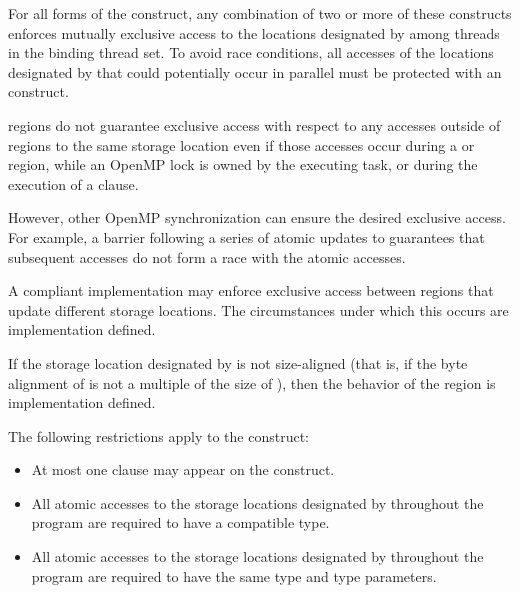 {{{{For all forms of the  construct, any combination of two or more
of these  constructs enforces mutually exclusive access to the
locations designated by  among threads in the binding thread set.  To
avoid race conditions, all accesses of the locations designated by 
that could potentially occur in parallel must be protected with an
 construct. 

 regions do not guarantee exclusive access with respect to any accesses outside 
of  regions to the same storage location  even if those accesses occur during a 
 or  region, while an OpenMP lock is owned by the executing 
task, or during the execution of a  clause.

However, other OpenMP synchronization can ensure the desired exclusive access. For 
example, a barrier following a series of atomic updates to  guarantees that subsequent 
accesses do not form a race with the atomic accesses. 

A compliant implementation may enforce exclusive access between  regions 
that update different storage locations. The circumstances under which this occurs are 
implementation defined. 

If the storage location designated by  is not size-aligned (that is, if the byte alignment 
of  is not a multiple of the size of ), then the behavior of the  region is 
implementation defined.

\begin{samepage}
\restrictions

The following restrictions apply to the  construct:

\begin{itemize}
\item At most one  clause may appear on the construct.
\end{itemize}

\ccppspecificstart
\begin{itemize}
\item All atomic accesses to the storage locations designated by  throughout the program 
are required to have a compatible type. 
\end{itemize}
\ccppspecificend
\end{samepage}

\fortranspecificstart
\begin{itemize}
\item All atomic accesses to the storage locations designated by  throughout the program 
are required to have the same type and type parameters. 
\end{itemize}
\fortranspecificend

}}}}
